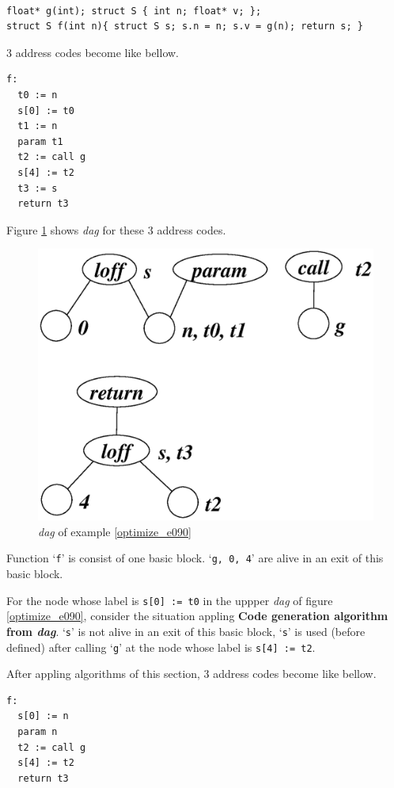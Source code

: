 \begin{Example}
\label{optimize_e091}
\begin{verbatim}

float* g(int); struct S { int n; float* v; };
struct S f(int n){ struct S s; s.n = n; s.v = g(n); return s; }
\end{verbatim}
3 address codes become like bellow.
\begin{verbatim}
f:
  t0 := n
  s[0] := t0
  t1 := n
  param t1
  t2 := call g
  s[4] := t2
  t3 := s
  return t3
\end{verbatim}
Figure \ref{optimize_e096} shows {\em dag} for these 3 address codes.
\begin{figure}[htbp]
\begin{center}
\includegraphics[width=0.8\linewidth,height=0.648\linewidth]{opt039.eps}
\caption{{\em dag} of example \ref{optimize_e090}}
\label{optimize_e096}
\end{center}
\end{figure}
Function `{\tt{f}}' is consist of one basic block.
`{\tt{g, 0, 4}}' are
alive in an exit of this basic block.

For the node whose label is {\tt{s[0] := t0}} in
the uppper {\em dag} of figure \ref{optimize_e090},
consider the situation appling
{\bf Code generation algorithm from {\em dag}}.
`{\tt{s}}' is not alive in an exit of this basic block,
`{\tt{s}}' is used (before defined) after calling `{\tt{g}}'
at the node whose label is {\tt{s[4] := t2}}.

After appling algorithms of this section,
3 address codes become like bellow.
\begin{verbatim}
f:
  s[0] := n
  param n
  t2 := call g
  s[4] := t2
  return t3
\end{verbatim}
\end{Example}

